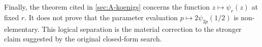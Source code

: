 Finally, the theorem cited in \cref{sec:A-koenigs} concerns the function
\(z\mapsto\psi_r(z)\) at fixed \(r\).  It does not prove that the parameter
evaluation \(p\mapsto2\psi_{2p}(1/2)\) is non-elementary.  This logical separation
is the material correction to the stronger claim suggested by the original
closed-form search.

\FloatBarrier
